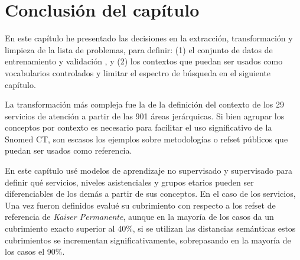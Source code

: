 \begin{table}
 \caption{Comparación de la cobertura de las especialidades del HIBA vs Nova Scotia }
  \label{coverage_scotia}
\end{table}

\section{Conclusión del capítulo}
En este capítulo he presentado las decisiones en la extracción, transformación y limpieza de la lista de problemas, para definir: (1) el conjunto de datos de entrenamiento y validación , y (2) los contextos que puedan ser usados como vocabularios controlados y limitar el espectro de búsqueda en el siguiente capítulo.

La transformación más compleja fue la de la definición del contexto de los 29 servicios de atención a partir de las 901 áreas jerárquicas. Si bien agrupar los conceptos por contexto es necesario para facilitar el uso significativo de la Snomed CT, son escasos los ejemplos sobre metodologías o  {\acrshort{refset}} públicos que puedan ser usados como referencia.

En este capítulo usé modelos de aprendizaje no supervisado y supervisado para definir qué servicios, niveles asistenciales y grupos etarios pueden ser diferenciables de los demás a partir de sus conceptos. En el caso de los servicios, Una vez fueron definidos evalué su cubrimiento con respecto a los  {\acrshort{refset}} de referencia de \textit{Kaiser Permanente}, aunque en la mayoría de los casos da un cubrimiento exacto superior al 40\%, si se utilizan las distancias semánticas estos cubrimientos se incrementan significativamente, sobrepasando en la mayoría de los casos el 90\%.
